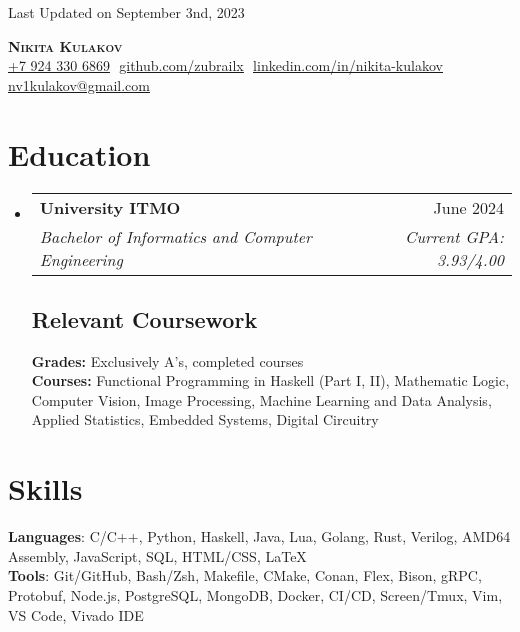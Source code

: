 \documentclass[letterpaper,11pt]{article}
\makeatletter
\newcommand{\resumeSubheading}[4]{
  \vspace{-2pt}\item
    \begin{tabular*}{0.97\textwidth}[t]{l@{\extracolsep{\fill}}r}
      \textbf{#1} & #2 \\
      \textit{\small#3} & \textit{\small #4} \\
    \end{tabular*}\vspace{-7pt}
}
\newcommand{\resumeSubHeadingListStart}{\begin{itemize}[leftmargin=0.15in, label={}]}
\newcommand{\resumeSubHeadingListEnd}{\end{itemize}}
\makeatother
\begin{document}
\begin{flushright}
  \vspace{-4pt}
  \color{gray}
  \item
  Last Updated on September 3nd, 2023
\end{flushright}

\vspace{-7pt}

\begin{center}
    \textbf{\huge \scshape Nikita Kulakov} \\ \vspace{8pt}
    \small 
    \href{tel:79243306869}{\underline{+7 924 330 6869}} $  $
    \href{https://github.com/zubrailx}{\underline{github.com/zubrailx}} $  $
    \href{https://www.linkedin.com/in/nikita-kulakov-8a21b7203/}{\underline{linkedin.com/in/nikita-kulakov}} $  $
    \href{mailto:nv1kulakov@gmail.com}
    {\underline{nv1kulakov@gmail.com}}
\end{center}

\section{Education}
  \resumeSubHeadingListStart
  
    \resumeSubheading
      {University ITMO}{June 2024}
      {Bachelor of Informatics and Computer Engineering}{Current GPA: 3.93/4.00}
      
    \subsection{Relevant Coursework}
      \textbf{Grades:} Exclusively A's, completed courses\\
      \textbf{Courses:} Functional Programming in Haskell (Part I, II), Mathematic Logic, Computer Vision, Image Processing, Machine Learning and Data Analysis, Applied Statistics, Embedded Systems, Digital Circuitry\\

  \resumeSubHeadingListEnd

\section{Skills}
 \begin{itemize}[leftmargin=0.15in, label={}]
    \small{\item{
    
     \textbf{Languages}{: C/C++, Python, Haskell, Java, Lua, Golang, Rust, Verilog, AMD64 Assembly, JavaScript, SQL, HTML/CSS, \LaTeX} \\
     
     \textbf{Tools}{: Git/GitHub, Bash/Zsh, Makefile, CMake, Conan, Flex, Bison, gRPC, Protobuf, Node.js, PostgreSQL, MongoDB, Docker, CI/CD, Screen/Tmux, Vim, VS Code, Vivado IDE}
    }}
 \end{itemize}
\end{document}
